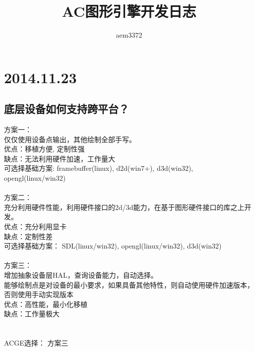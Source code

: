 \documentclass[12pt,a4paper]{report}
\title{\erhao AC图形引擎开发日志}
\author{aem3372}
\begin{document}
\maketitle
\section*{2014.11.23}
  \subsection*{底层设备如何支持跨平台？}
    方案一：\\
    仅仅使用设备点输出，其他绘制全部手写。\\
    优点：移植方便, 定制性强\\
    缺点：无法利用硬件加速，工作量大\\
    可选择基础方案: framebuffer(linux), d2d(win7+), d3d(win32), opengl(linux/win32)\\
    \\
    方案二：\\
    充分利用硬件性能，利用硬件接口的2d/3d能力，在基于图形硬件接口的库之上开发。\\
    优点：充分利用显卡\\
    缺点：定制性差\\
    可选择基础方案： SDL(linux/win32), opengl(linux/win32), d3d(win32)\\
    \\
    方案三：\\
    增加抽象设备层HAL，查询设备能力，自动选择。\\
    能够绘制点是对设备的最小要求，如果具备其他特性，则自动使用硬件加速版本，否则使用手动实现版本\\
    优点：高性能，最小化移植\\
    缺点：工作量极大\\
    \\
    \\
    ACGE选择： 方案三\\
\end{document}
